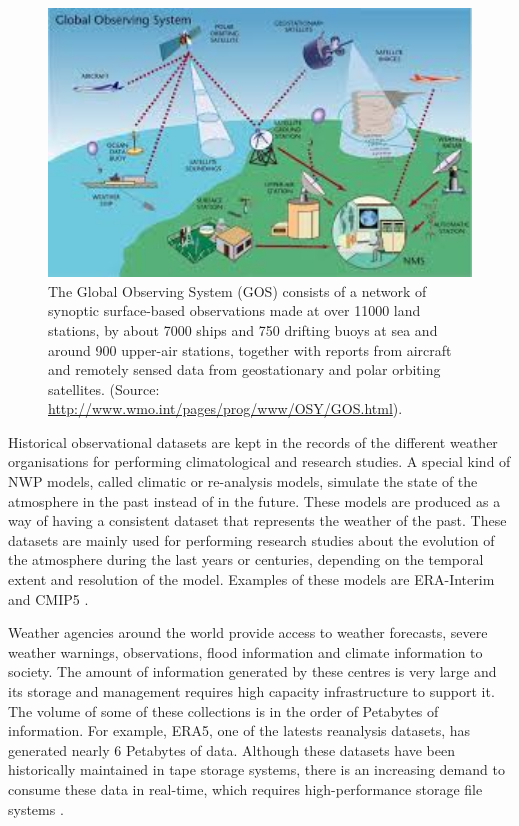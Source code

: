 \begin{figure}[h]
	\centerline{\includegraphics[width=12cm]{gos_wmo.jpg}} \caption{ The Global Observing System (GOS) consists of a network of synoptic surface-based observations made at over 11000 land stations, by about 7000 ships and 750 drifting buoys at sea and around 900 upper-air stations, together with reports from aircraft and remotely sensed data from geostationary and polar orbiting satellites. (Source: \url{http://www.wmo.int/pages/prog/www/OSY/GOS.html}).}\label{gos_wmo}
\end{figure}

Historical observational datasets are kept in the records of the different weather organisations for performing climatological and research studies. A special kind of NWP models, called climatic or re-analysis models, simulate the state of the atmosphere in the past instead of in the future. These models are produced as a way of having a consistent dataset that represents the weather of the past. These datasets are mainly used for performing research studies about the evolution of the atmosphere during the last years or centuries, depending on the temporal extent and resolution of the model. Examples of these models are ERA-Interim \citep{dee2011era} and CMIP5 \citep{taylor2012overview}.  

\medskip

Weather agencies around the world provide access to weather forecasts, severe weather warnings, observations, flood information and climate information to society. The amount of information generated by these centres is very large and its storage and management requires high capacity infrastructure to support it. The volume of some of these collections is in the order of Petabytes of information. For example, ERA5, one of the latests reanalysis datasets, has generated nearly 6 Petabytes of data. Although these datasets have been historically maintained in tape storage systems, there is an increasing demand to consume these data in real-time, which requires high-performance storage file systems \citep{evans2015nci}.

